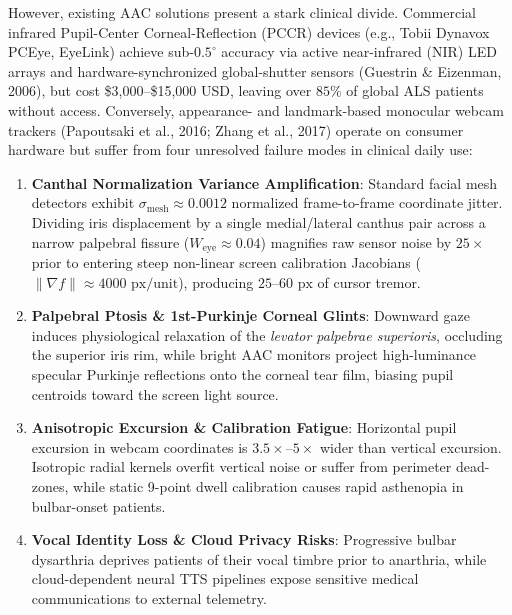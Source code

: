 \documentclass[twocolumn,10pt]{article}
\begin{document}
However, existing AAC solutions present a stark clinical divide. Commercial infrared Pupil-Center Corneal-Reflection (PCCR) devices (e.g., Tobii Dynavox PCEye, EyeLink) achieve sub-$0.5^\circ$ accuracy via active near-infrared (NIR) LED arrays and hardware-synchronized global-shutter sensors (Guestrin \& Eizenman, 2006), but cost \$3,000--\$15,000 USD, leaving over $85\%$ of global ALS patients without access. Conversely, appearance- and landmark-based monocular webcam trackers (Papoutsaki et al., 2016; Zhang et al., 2017) operate on consumer hardware but suffer from four unresolved failure modes in clinical daily use:
\begin{enumerate}
    \item \textbf{Canthal Normalization Variance Amplification}: Standard facial mesh detectors exhibit $\sigma_{\text{mesh}} \approx 0.0012$ normalized frame-to-frame coordinate jitter. Dividing iris displacement by a single medial/lateral canthus pair across a narrow palpebral fissure ($W_{\text{eye}} \approx 0.04$) magnifies raw sensor noise by $25\times$ prior to entering steep non-linear screen calibration Jacobians ($\|\nabla f\| \approx 4000\text{ px/unit}$), producing $25\text{--}60\text{ px}$ of cursor tremor.
    \item \textbf{Palpebral Ptosis \& 1st-Purkinje Corneal Glints}: Downward gaze induces physiological relaxation of the \textit{levator palpebrae superioris}, occluding the superior iris rim, while bright AAC monitors project high-luminance specular Purkinje reflections onto the corneal tear film, biasing pupil centroids toward the screen light source.
    \item \textbf{Anisotropic Excursion \& Calibration Fatigue}: Horizontal pupil excursion in webcam coordinates is $3.5\times\text{--}5\times$ wider than vertical excursion. Isotropic radial kernels overfit vertical noise or suffer from perimeter dead-zones, while static 9-point dwell calibration causes rapid asthenopia in bulbar-onset patients.
    \item \textbf{Vocal Identity Loss \& Cloud Privacy Risks}: Progressive bulbar dysarthria deprives patients of their vocal timbre prior to anarthria, while cloud-dependent neural TTS pipelines expose sensitive medical communications to external telemetry.
\end{enumerate}
\end{document}
